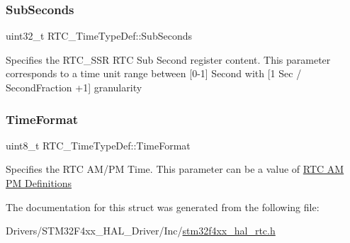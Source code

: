 \subsubsection{\texorpdfstring{Sub\+Seconds}{SubSeconds}}
{\footnotesize\ttfamily uint32\+\_\+t R\+T\+C\+\_\+\+Time\+Type\+Def\+::\+Sub\+Seconds}

Specifies the R\+T\+C\+\_\+\+S\+SR R\+TC Sub Second register content. This parameter corresponds to a time unit range between \mbox{[}0-\/1\mbox{]} Second with \mbox{[}1 Sec / Second\+Fraction +1\mbox{]} granularity \mbox{\label{struct_r_t_c___time_type_def_a701c21c52472e8caf9e23653ec2fd604}} 
\subsubsection{\texorpdfstring{Time\+Format}{TimeFormat}}
{\footnotesize\ttfamily uint8\+\_\+t R\+T\+C\+\_\+\+Time\+Type\+Def\+::\+Time\+Format}

Specifies the R\+TC A\+M/\+PM Time. This parameter can be a value of \hyperlink{group___r_t_c___a_m___p_m___definitions}{R\+TC AM PM Definitions} 

The documentation for this struct was generated from the following file\+:\begin{DoxyCompactItemize}
\item 
Drivers/\+S\+T\+M32\+F4xx\+\_\+\+H\+A\+L\+\_\+\+Driver/\+Inc/\hyperlink{stm32f4xx__hal__rtc_8h}{stm32f4xx\+\_\+hal\+\_\+rtc.\+h}\end{DoxyCompactItemize}
